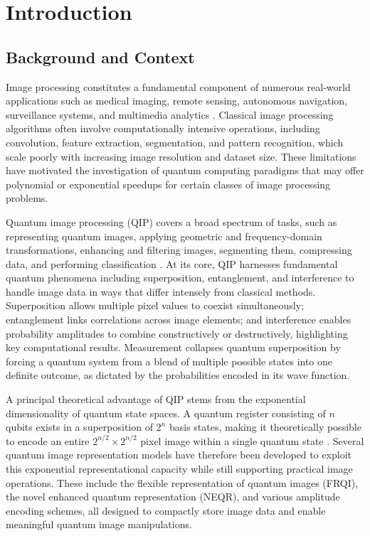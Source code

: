 \documentclass[11pt,a4paper]{article}
\begin{document}

\section{Introduction}
\label{sec:introduction}

\subsection{Background and Context}
\label{subsec:background}
Image processing constitutes a fundamental component of numerous real-world applications such as medical imaging, remote sensing, autonomous navigation, surveillance systems, and multimedia analytics \cite{ref11}. Classical image processing algorithms often involve computationally intensive operations, including convolution, feature extraction, segmentation, and pattern recognition, which scale poorly with increasing image resolution and dataset size. These limitations have motivated the investigation of quantum computing paradigms that may offer polynomial or exponential speedups for certain classes of image processing problems\cite{ref12}.

Quantum image processing (QIP) covers a broad spectrum of tasks, such as representing quantum images, applying geometric and frequency-domain transformations, enhancing and filtering images, segmenting them, compressing data, and performing classification \cite{ref13}. At its core, QIP harnesses fundamental quantum phenomena including superposition, entanglement, and interference to handle image data in ways that differ intensely from classical methods. Superposition allows multiple pixel values to coexist simultaneously; entanglement links correlations across image elements; and interference enables probability amplitudes to combine constructively or destructively, highlighting key computational results. Measurement collapses quantum superposition by forcing a quantum system from a blend of multiple possible states into one definite outcome, as dictated by the probabilities encoded in its wave function.

A principal theoretical advantage of QIP stems from the exponential dimensionality of quantum state spaces. A quantum register consisting of $n$ qubits exists in a superposition of $2^n$ basis states, making it theoretically possible to encode an entire $2^{n/2} \times 2^{n/2}$ pixel image within a single quantum state \cite{ref14}. Several quantum image representation models have therefore been developed to exploit this exponential representational capacity while still supporting practical image operations. These include the flexible representation of quantum images (FRQI), the novel enhanced quantum representation (NEQR), and various amplitude encoding schemes, all designed to compactly store image data and enable meaningful quantum image manipulations.
\end{document}
